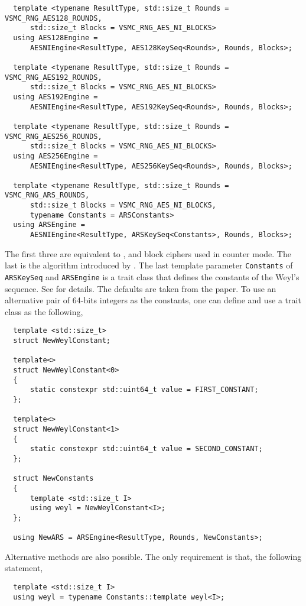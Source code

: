 \begin{Verbatim}
  template <typename ResultType, std::size_t Rounds = VSMC_RNG_AES128_ROUNDS,
      std::size_t Blocks = VSMC_RNG_AES_NI_BLOCKS>
  using AES128Engine =
      AESNIEngine<ResultType, AES128KeySeq<Rounds>, Rounds, Blocks>;

  template <typename ResultType, std::size_t Rounds = VSMC_RNG_AES192_ROUNDS,
      std::size_t Blocks = VSMC_RNG_AES_NI_BLOCKS>
  using AES192Engine =
      AESNIEngine<ResultType, AES192KeySeq<Rounds>, Rounds, Blocks>;

  template <typename ResultType, std::size_t Rounds = VSMC_RNG_AES256_ROUNDS,
      std::size_t Blocks = VSMC_RNG_AES_NI_BLOCKS>
  using AES256Engine =
      AESNIEngine<ResultType, AES256KeySeq<Rounds>, Rounds, Blocks>;

  template <typename ResultType, std::size_t Rounds = VSMC_RNG_ARS_ROUNDS,
      std::size_t Blocks = VSMC_RNG_AES_NI_BLOCKS,
      typename Constants = ARSConstants>
  using ARSEngine =
      AESNIEngine<ResultType, ARSKeySeq<Constants>, Rounds, Blocks>;
\end{Verbatim}
The first three are equivalent to ,  and  block ciphers
used in counter mode. The last is the \ars algorithm introduced by
\textcite{Salmon:2011um}. The last template parameter \verb|Constants| of
\verb|ARSKeySeq| and \verb|ARSEngine| is a trait class that defines the
constants of the Weyl's sequence. See \textcite{Salmon:2011um} for details. The
defaults are taken from the paper. To use an alternative pair of 64-bits
integers as the constants, one can define and use a trait class as the
following,
\begin{Verbatim}
  template <std::size_t>
  struct NewWeylConstant;

  template<>
  struct NewWeylConstant<0>
  {
      static constexpr std::uint64_t value = FIRST_CONSTANT;
  };

  template<>
  struct NewWeylConstant<1>
  {
      static constexpr std::uint64_t value = SECOND_CONSTANT;
  };

  struct NewConstants
  {
      template <std::size_t I>
      using weyl = NewWeylConstant<I>;
  };

  using NewARS = ARSEngine<ResultType, Rounds, NewConstants>;
\end{Verbatim}
Alternative methods are also possible. The only requirement is that, the
following statement,
\begin{Verbatim}
  template <std::size_t I>
  using weyl = typename Constants::template weyl<I>;
\end{Verbatim}
